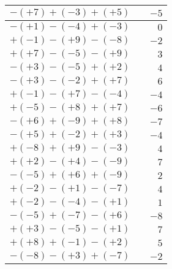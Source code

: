 \documentclass[a4paper,12pt]{scrartcl}
\begin{document}
\begin{center}
\begin{tabular}{|l|l|r|}
$-(+7)+(-3)+(+5)$ & & $-5$\\ \hline
$-(+1)-(-4)+(-3)$ & & $0$\\ \hline
$+(-1)-(+9)-(-8)$ & & $-2$\\ \hline
$+(+7)-(-5)-(+9)$ & & $3$\\ \hline
$-(+3)-(-5)+(+2)$ & & $4$\\ \hline
$-(+3)-(-2)+(+7)$ & & $6$\\ \hline
$+(-1)-(+7)-(-4)$ & & $-4$\\ \hline
$+(-5)-(+8)+(+7)$ & & $-6$\\ \hline
$-(+6)+(-9)+(+8)$ & & $-7$\\ \hline
$-(+5)+(-2)+(+3)$ & & $-4$\\ \hline
$+(-8)+(+9)-(-3)$ & & $4$\\ \hline
$+(+2)-(+4)-(-9)$ & & $7$\\ \hline
$-(-5)+(+6)+(-9)$ & & $2$\\ \hline
$+(-2)-(+1)-(-7)$ & & $4$\\ \hline
$+(-2)-(-4)-(+1)$ & & $1$\\ \hline
$-(-5)+(-7)-(+6)$ & & $-8$\\ \hline
$+(+3)-(-5)-(+1)$ & & $7$\\ \hline
$+(+8)+(-1)-(+2)$ & & $5$\\ \hline
$-(-8)-(+3)+(-7)$ & & $-2$\\\hline
\end{tabular}
\end{center}
\end{document}
